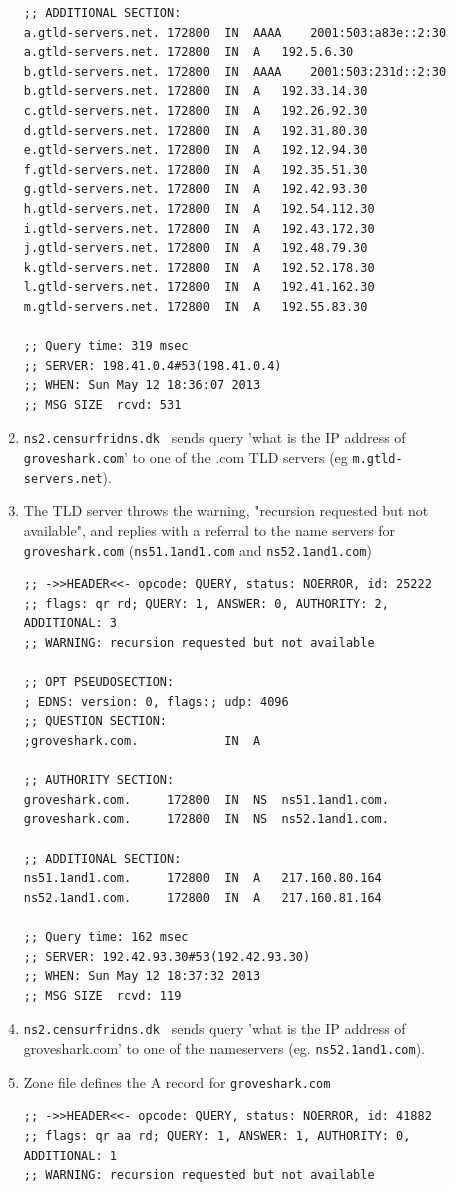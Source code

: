 \begin{description}
\begin{enumerate}
\begin{lstlisting}
;; ADDITIONAL SECTION:
a.gtld-servers.net. 172800  IN  AAAA    2001:503:a83e::2:30
a.gtld-servers.net. 172800  IN  A   192.5.6.30
b.gtld-servers.net. 172800  IN  AAAA    2001:503:231d::2:30
b.gtld-servers.net. 172800  IN  A   192.33.14.30
c.gtld-servers.net. 172800  IN  A   192.26.92.30
d.gtld-servers.net. 172800  IN  A   192.31.80.30
e.gtld-servers.net. 172800  IN  A   192.12.94.30
f.gtld-servers.net. 172800  IN  A   192.35.51.30
g.gtld-servers.net. 172800  IN  A   192.42.93.30
h.gtld-servers.net. 172800  IN  A   192.54.112.30
i.gtld-servers.net. 172800  IN  A   192.43.172.30
j.gtld-servers.net. 172800  IN  A   192.48.79.30
k.gtld-servers.net. 172800  IN  A   192.52.178.30
l.gtld-servers.net. 172800  IN  A   192.41.162.30
m.gtld-servers.net. 172800  IN  A   192.55.83.30

;; Query time: 319 msec
;; SERVER: 198.41.0.4#53(198.41.0.4)
;; WHEN: Sun May 12 18:36:07 2013
;; MSG SIZE  rcvd: 531

                \end{lstlisting}
            \item \texttt{ns2.censurfridns.dk } sends query 'what is the IP
                address of \texttt{groveshark.com}' to one of the .com TLD servers (eg
                \texttt{m.gtld-servers.net}).
            \item The TLD server throws the warning, "recursion requested but
                not available", and replies with a referral to the name servers
                for \texttt{groveshark.com}
                (\texttt{ns51.1and1.com} and \texttt{ns52.1and1.com})
                \begin{lstlisting}
;; ->>HEADER<<- opcode: QUERY, status: NOERROR, id: 25222
;; flags: qr rd; QUERY: 1, ANSWER: 0, AUTHORITY: 2, ADDITIONAL: 3
;; WARNING: recursion requested but not available

;; OPT PSEUDOSECTION:
; EDNS: version: 0, flags:; udp: 4096
;; QUESTION SECTION:
;groveshark.com.            IN  A

;; AUTHORITY SECTION:
groveshark.com.     172800  IN  NS  ns51.1and1.com.
groveshark.com.     172800  IN  NS  ns52.1and1.com.

;; ADDITIONAL SECTION:
ns51.1and1.com.     172800  IN  A   217.160.80.164
ns52.1and1.com.     172800  IN  A   217.160.81.164

;; Query time: 162 msec
;; SERVER: 192.42.93.30#53(192.42.93.30)
;; WHEN: Sun May 12 18:37:32 2013
;; MSG SIZE  rcvd: 119
                \end{lstlisting}
            \item \texttt{ns2.censurfridns.dk } sends query 'what is the IP
                address of groveshark.com' to one of the nameservers (eg.
                \texttt{ns52.1and1.com}).
            \item Zone file defines the A record for \texttt{groveshark.com}
                \begin{lstlisting}
;; ->>HEADER<<- opcode: QUERY, status: NOERROR, id: 41882
;; flags: qr aa rd; QUERY: 1, ANSWER: 1, AUTHORITY: 0, ADDITIONAL: 1
;; WARNING: recursion requested but not available


\end{lstlisting}
\end{enumerate}
\end{description}
